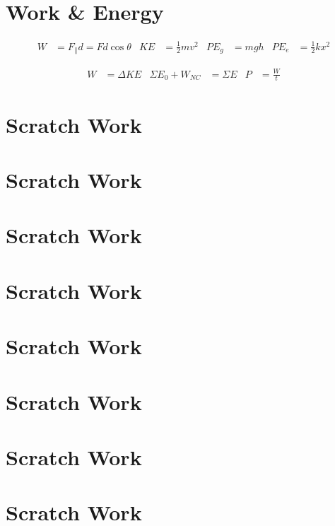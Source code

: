 \documentclass[10pt]{exam}
\begin{document}
{  \section*{Work \& Energy}

  \begin{align*}
    W    &= F_\parallel d = F d \cos\theta  &
    KE   &= \frac{1}{2} mv^2 &
    PE_g &= mgh &
    PE_e &= \frac{1}{2} kx^2
  \end{align*}

  \begin{align*}
    W &= \Delta KE &
    \Sigma E_0 + W_{NC} &= \Sigma E &
    P &= \frac{W}{t}
  \end{align*}
}


\pagebreak
\eqs
\pagebreak 
\section*{Scratch Work} 
\pagebreak
\section*{Scratch Work} 
\pagebreak


\pagebreak
\eqs
\pagebreak 
\section*{Scratch Work} 
\pagebreak
\section*{Scratch Work} 
\pagebreak


\pagebreak
\eqs
\pagebreak 
\section*{Scratch Work} 
\pagebreak
\section*{Scratch Work} 
\pagebreak


\pagebreak
\eqs
\pagebreak 
\section*{Scratch Work} 
\pagebreak
\section*{Scratch Work} 
\pagebreak
\end{document}
